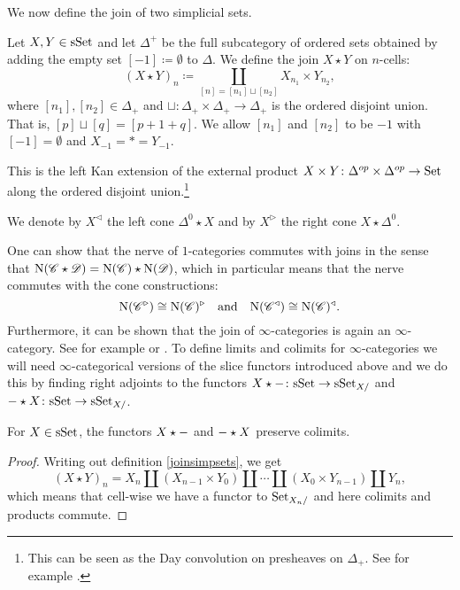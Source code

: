 \documentclass[../../thesis.tex]{subfiles}
\begin{document}
We now define the join of two simplicial sets.
\begin{definition}\label{joinsimpsets}
    Let $X, Y \in \mathrm{sSet}$ and let $\Delta^+$ be the full subcategory of ordered sets obtained by adding the empty set $[-1]\coloneqq\emptyset$ to $\Delta$.
    We define the join $X\star Y$ on $n$-cells:
    \[
        (X\star Y)_n \coloneqq \coprod_{[n] = [n_1] \sqcup [n_2]} X_{n_1} \times Y_{n_2},
    \]
    where $[n_1], [n_2] \in \Delta_+$ and $\sqcup \colon \Delta_+ \times \Delta_+ \to \Delta_+$ is the ordered disjoint union.
    That is, $[p] \sqcup [q] = [p+1+q]$.
    We allow $[n_1]$ and $[n_2]$ to be $-1$ with $[-1]=\emptyset$ and $X_{-1} = * = Y_{-1}$.
\end{definition}
\begin{remark}
    This is the left Kan extension of the external product $X \times Y\colon \Delta^{op}\times \Delta^{op}\to \mathrm{Set}$ along the ordered disjoint union.\footnote{This can be seen as the Day convolution on presheaves on $\Delta_+$. See for example \cite{nlab:join_of_simplicial_sets}.}
\end{remark}
\begin{example}
    We denote by $X^{\triangleleft}$ the left cone $\Delta^0 \star X$ and by $X^{\triangleright}$ the right cone $X\star \Delta^0$.
\end{example}
One can show that the nerve of $1$-categories commutes with joins in the sense that $\mathrm{N}(\mathscr{C} \star \mathscr{D}) = \mathrm{N}(\mathscr{C}) \star \mathrm{N}(\mathscr{D})$, which in particular means that the nerve commutes with the cone constructions:
\[
    \mathrm{N}(\mathscr{C}^{\triangleright}) \cong \mathrm{N}(\mathscr{C})^{\triangleright}\quad \text{and} \quad\mathrm{N}(\mathscr{C}^{\triangleleft}) \cong \mathrm{N}(\mathscr{C})^{\triangleleft}.
\]
Furthermore, it can be shown that the join of $\infty$-categories is again an $\infty$-category.
See for example \cite[\href{https://kerodon.net/tag/02QV}{Corollary 02QV}]{kerodon} or \cite[Proposition 28.17.]{Rezk}.
To define limits and colimits for $\infty$-categories we will need $\infty$-categorical versions of the slice functors introduced above and we do this by finding right adjoints to the functors $X\star {-} \colon \mathrm{sSet} \to \mathrm{sSet}_{X/}$ and ${-} \star X\colon \mathrm{sSet} \to \mathrm{sSet}_{X/}$.
\begin{proposition}
    For $X\in \mathrm{sSet}$, the functors $X\star {-}$ and ${-} \star X$ preserve colimits.
\end{proposition}
\begin{proof}
    Writing out definition \ref{joinsimpsets}, we get
    \[
        (X\star Y)_n = X_n \coprod (X_{n-1} \times Y_0) \coprod \cdots \coprod (X_0 \times Y_{n-1}) \coprod Y_n,
    \]
    which means that cell-wise we have a functor to $\mathrm{Set}_{X_n/}$ and here colimits and products commute.
\end{proof}
\end{document}
